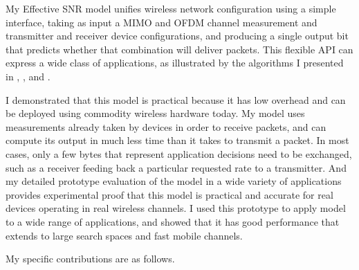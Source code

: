 My Effective SNR model unifies wireless network configuration using a simple interface, taking as input a MIMO and OFDM channel measurement and transmitter and receiver device configurations, and producing a single output bit that predicts whether that combination will deliver packets. This flexible API can express a wide class of applications, as illustrated by the algorithms I presented in , , and .

I demonstrated that this model is practical because it has low overhead and can be deployed using commodity wireless hardware today. My model uses measurements already taken by devices in order to receive packets, and can compute its output in much less time than it takes to transmit a packet. In most cases, only a few bytes that represent application decisions need to be exchanged, such as a receiver feeding back a particular requested rate to a transmitter. And my detailed prototype evaluation of the model in a wide variety of applications provides experimental proof that this model is practical and accurate for real devices operating in real wireless channels. I used this prototype to apply model to a wide range of applications, and showed that it has good performance that extends to large search spaces and fast mobile channels.

My specific contributions are as follows.

